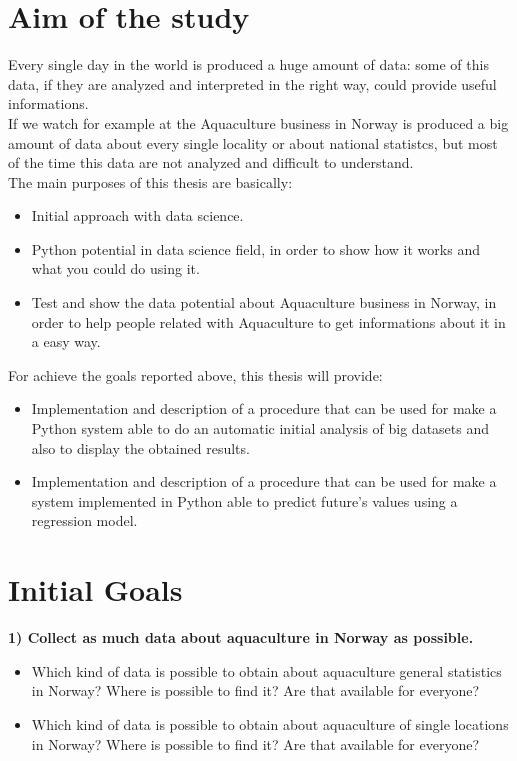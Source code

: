 


\section{Aim of the study}
Every single day in the world is produced a huge amount of data: some of this data, if they are analyzed and interpreted in the right way, could provide useful informations.\\
If we watch for example at the Aquaculture business in Norway is produced a big amount of data about every single locality or about national statistcs, but most of the time this data are not analyzed and difficult to understand.\\
The main purposes of this thesis are basically:
\begin{itemize} 
 \item Initial approach with data science.
 
 \item Python potential in data science field, in order to show how it works and what you could do using it.
 
 \item 	Test and show the data potential about Aquaculture business in Norway, in order to help people related with Aquaculture to get informations about it in a easy way.

 \end{itemize}
For achieve the goals reported above, this thesis will provide:
\begin{itemize} 
 \item 	Implementation and description of a procedure that can be used for make a Python system able to do an automatic initial analysis of big datasets and also to display the obtained results.
 \item Implementation and description of a procedure that can be used for make a system implemented in Python able to predict future’s values using a regression model.
 
 \end{itemize}

\newpage
\section{Initial Goals}

\textbf{1) Collect as much data about aquaculture in Norway as possible.}
\vspace{-5mm}
\begin{itemize}
 \setlength{\itemsep}{-5pt}
  \item Which kind of data is possible to obtain about aquaculture general statistics in Norway? Where is possible to find it? Are that available for everyone?
  \item Which kind of data is possible to obtain about aquaculture of single locations in Norway? Where is possible to find it? Are that available for everyone?
\end{itemize}

